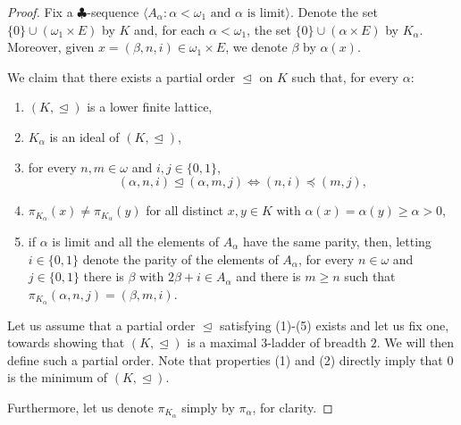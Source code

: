 \documentclass[]{amsart}
\theoremstyle{definition}
\theoremstyle{remark}
\begin{document}
\begin{proof}
Fix a $\clubsuit$-sequence $\langle A_\alpha : \alpha < \omega_1 \text{ and } \alpha \text{ is limit}\rangle$. Denote the set $\{0\} \cup (\omega_1 \times E)$ by $K$ and, for each $\alpha < \omega_1$, the set $\{0\} \cup (\alpha \times E)$ by $K_\alpha$. Moreover, given $x = (\beta, n, i) \in \omega_1 \times E$, we denote $\beta$ by $\alpha(x)$.

We claim that there exists a partial order $\trianglelefteq$ on $K$ such that, for every $\alpha$:
\begin{enumerate}
\item $(K, \trianglelefteq)$ is a lower finite lattice,
\item $K_\alpha$ is an ideal of $(K, \trianglelefteq)$,
\item for every $n,m\in\omega$ and $i,j\in\{0,1\}$,
\[
(\alpha,n,i)\trianglelefteq(\alpha,m,j)
\iff (n,i)\preceq(m,j),
\]
\item $\pi_{K_\alpha}(x) \neq \pi_{K_\alpha}(y)$ for all distinct $x,y\in K$ with $\alpha(x) = \alpha(y) \ge \alpha > 0$,

\item if $\alpha$ is limit and all the elements of $A_\alpha$ have the same parity, then, letting $i \in \{0,1\}$ denote the parity of the elements of $A_\alpha$, for every $n\in\omega$ and  $j \in \{0,1\}$ there is $\beta$  with $2\beta + i \in A_\alpha$ and there is $m \ge n$ such that $\pi_{K_\alpha} (\alpha, n, j) = (\beta, m, i)$.



\end{enumerate}


Let us assume that a partial order $\trianglelefteq$ satisfying (1)-(5) exists and let us fix one, towards showing that $(K, \trianglelefteq)$ is a maximal $3$-ladder of breadth $2$. We will then define such a partial order. Note that properties (1) and (2) directly imply that $0$ is the minimum of $(K, \trianglelefteq)$.

Furthermore, let us denote $\pi_{K_\alpha}$ simply by $\pi_\alpha$, for clarity.


\end{proof}
\end{document}
